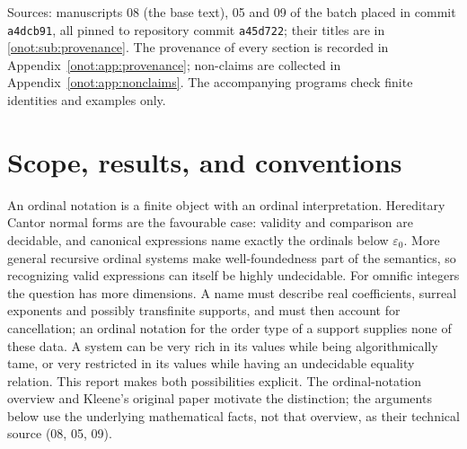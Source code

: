 \documentclass[11pt,oneside]{article}
\numberwithin{equation}{section}
\theoremstyle{definition}
\theoremstyle{remark}
\begin{document}
\begin{titlepage}
\begin{minipage}{\textwidth}
\begin{abstract}
On the negative side, primitive-recursive coefficient streams on $d$ fixed
positive blocks always denote omnific integers, but their equality is
$\Pi^0_1$-complete and their positivity is many-one complete for the $d$-c.e.\
sets, already on values with at most $d$ monomials; no algorithm translates
these names into any system with decidable equality, although every value has a
rational name; for full-support rational switch streams the minimal realization
dimension is exactly $s+1$ and has no computable bound. With a decidable dyadic
support in $[1,2)$ and all coefficients one, support validity is
$\Pi^1_1$-complete.

This report merges three independently written manuscripts; it states which
source proved each result, prints shared results once, and keeps every
source's limitations. Several results were already in the collection and are
cited rather than reprinted. It is an AI-assisted draft: it has not been
refereed, and nothing in it has been formalized in Lean.
\end{abstract}
\end{minipage}
\vfill
\begin{minipage}{\textwidth}
\footnotesize
Sources: manuscripts 08 (the base text), 05 and 09 of the batch placed in
commit \texttt{a4dcb91}, all pinned to repository commit \texttt{a45d722};
their titles are in \cref{onot:sub:provenance}. The provenance of every
section is recorded in Appendix~\ref{onot:app:provenance}; non-claims are
collected in Appendix~\ref{onot:app:nonclaims}. The accompanying programs check
finite identities and examples only.
\end{minipage}
\end{titlepage}
\hypersetup{pageanchor=true}
\tableofcontents
\newpage

\section{Scope, results, and conventions}\label{onot:sec:intro}

An ordinal notation is a finite object with an ordinal interpretation.
Hereditary Cantor normal forms are the favourable case: validity and comparison
are decidable, and canonical expressions name exactly the ordinals below
$\varepsilon_0$. More general recursive ordinal systems make well-foundedness
part of the semantics, so recognizing valid expressions can itself be highly
undecidable. For omnific integers the question has more dimensions. A name must
describe real coefficients, surreal exponents and possibly transfinite supports,
and must then account for cancellation; an ordinal notation for the order type
of a support supplies none of these data. A system can be very rich in its
values while being algorithmically tame, or very restricted in its values while
having an undecidable equality relation. This report makes both possibilities
explicit. The ordinal-notation overview \cite{ordinalwiki} and Kleene's original
paper \cite{Kleene} motivate the distinction; the arguments below use the
underlying mathematical facts, not that overview, as their technical source
(08, 05, 09).
\end{document}

